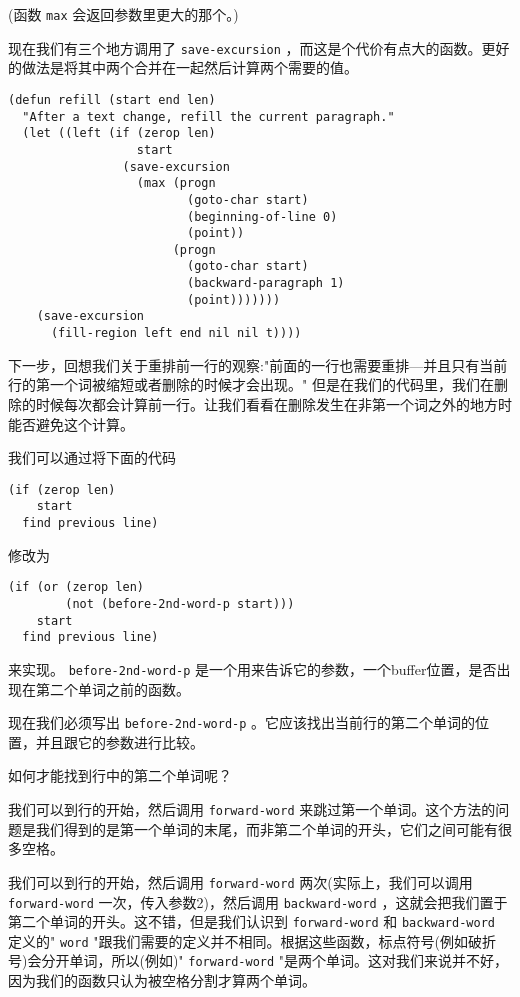 (函数 \texttt{max} 会返回参数里更大的那个。)

现在我们有三个地方调用了 \texttt{save-excursion} ，而这是个代价有点大的函数。更好的做法是将其中两个合并在一起然后计算两个需要的值。

\begin{verbatim}
(defun refill (start end len)
  "After a text change, refill the current paragraph."
  (let ((left (if (zerop len)
                  start
                (save-excursion
                  (max (progn
                         (goto-char start)
                         (beginning-of-line 0)
                         (point))
                       (progn
                         (goto-char start)
                         (backward-paragraph 1)
                         (point)))))))
    (save-excursion
      (fill-region left end nil nil t))))
\end{verbatim}

下一步，回想我们关于重排前一行的观察:"前面的一行也需要重排---并且只有当前行的第一个词被缩短或者删除的时候才会出现。" 但是在我们的代码里，我们在删除的时候每次都会计算前一行。让我们看看在删除发生在非第一个词之外的地方时能否避免这个计算。

我们可以通过将下面的代码

\begin{verbatim}
(if (zerop len)
    start
  find previous line)
\end{verbatim}

修改为

\begin{verbatim}
(if (or (zerop len)
        (not (before-2nd-word-p start)))
    start
  find previous line)
\end{verbatim}

来实现。 \texttt{before-2nd-word-p} 是一个用来告诉它的参数，一个buffer位置，是否出现在第二个单词之前的函数。

现在我们必须写出 \texttt{before-2nd-word-p} 。它应该找出当前行的第二个单词的位置，并且跟它的参数进行比较。

如何才能找到行中的第二个单词呢？

我们可以到行的开始，然后调用 \texttt{forward-word} 来跳过第一个单词。这个方法的问题是我们得到的是第一个单词的末尾，而非第二个单词的开头，它们之间可能有很多空格。

我们可以到行的开始，然后调用 \texttt{forward-word} 两次(实际上，我们可以调用 \texttt{forward-word} 一次，传入参数2)，然后调用 \texttt{backward-word} ，这就会把我们置于第二个单词的开头。这不错，但是我们认识到 \texttt{forward-word} 和 \texttt{backward-word} 定义的" \texttt{word} "跟我们需要的定义并不相同。根据这些函数，标点符号(例如破折号)会分开单词，所以(例如)" \texttt{forward-word} "是两个单词。这对我们来说并不好，因为我们的函数只认为被空格分割才算两个单词。

